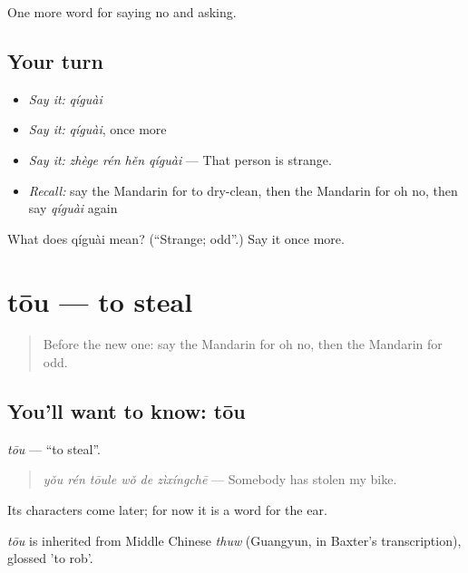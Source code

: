\begin{grammarlens}[title={What you've built}]
One more word for saying no and asking.
\end{grammarlens}

\subsection*{Your turn}
\begin{itemize}
\raggedright
  \item \emph{Say it:} \emph{qíguài}
  \item \emph{Say it:} \emph{qíguài}, once more
  \item \emph{Say it:} \emph{zhège rén hěn qíguài} — That person is strange.
  \item \emph{Recall:} say the Mandarin for to dry-clean, then the Mandarin for oh no, then say \emph{qíguài} again
\end{itemize}

\begin{tcolorbox}[breakable,colback=teal!4,colframe=teal!35!black,title={Before you move on}]
What does qíguài mean? (\textquotedblleft{}Strange; odd\textquotedblright{}.) Say it once more.
\end{tcolorbox}
\section[tōu]{tōu — to steal}

\label{lesson:ZH-C216-tou}



\begin{quote}
Before the new one: say the Mandarin for oh no, then the Mandarin for odd.
\end{quote}

\subsection*{You'll want to know: tōu}
\emph{tōu} — \textquotedblleft{}to steal\textquotedblright{}.

\begin{quote}
\emph{yǒu rén tōule wǒ de zìxíngchē} — Somebody has stolen my bike.
\end{quote}

Its characters come later; for now it is a word for the ear.

\begin{cousinweb}
\emph{tōu} is inherited from Middle Chinese \emph{thuw} (Guangyun, in Baxter's transcription), glossed 'to rob'.
\end{cousinweb}

